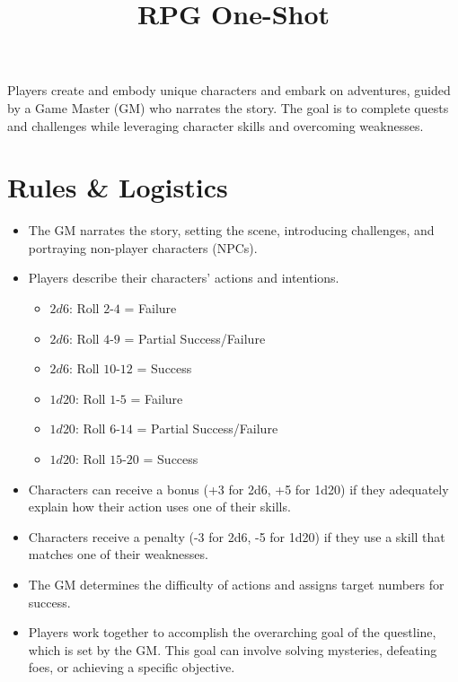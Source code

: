 \documentclass{article}
\title{RPG One-Shot}
\date{} %
\begin{document}
\maketitle %
\thispagestyle{empty} %
\vspace{-1cm}

Players create and embody unique characters and embark on adventures, guided by a Game Master (GM) who narrates the story. The goal is to complete quests and challenges while leveraging character skills and overcoming weaknesses.


\section*{Rules \& Logistics}



\begin{itemize}
  \item The GM narrates the story, setting the scene, introducing challenges, and portraying non-player characters (NPCs).
  \item Players describe their characters' actions and intentions. 
  \begin{multicols}{2}
    \begin{itemize}
      \item $2d6$: Roll $2$-$4$ = Failure
      \item $2d6$: Roll $4$-$9$ = Partial Success/Failure
      \item $2d6$: Roll $10$-$12$ = Success
      \item $1d20$: Roll $1$-$5$ = Failure
      \item $1d20$: Roll $6$-$14$ = Partial Success/Failure
      \item $1d20$: Roll $15$-$20$ = Success
    \end{itemize}
  \end{multicols}
  \item Characters can receive a bonus (+3 for 2d6, +5 for 1d20) if they adequately explain how their action uses one of their skills.
  \item   Characters receive a penalty (-3 for 2d6, -5 for 1d20) if they use a skill that matches one of their weaknesses.    
  \item The GM determines the difficulty of actions and assigns target numbers for success.      
  \item Players work together to accomplish the overarching goal of the questline, which is set by the GM. This goal can involve solving mysteries, defeating foes, or achieving a specific objective.
\end{itemize}
\end{document}
